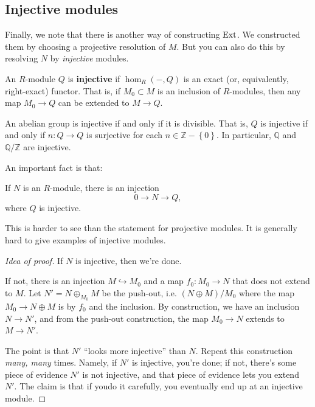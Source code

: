 \subsection{Injective modules}

Finally, we note that there is another way of constructing
$\mathrm{Ext}$. We
constructed them by choosing a projective resolution of $M$. But
you can also
do this by resolving $N$ by \emph{injective} modules. 
\begin{definition} 
An $R$-module $Q$ is \textbf{injective} if $\hom_R(-,Q)$ is an
exact (or,
equivalently, right-exact) functor. That is, if $M_0 \subset M$
is an inclusion
of $R$-modules, then any map $M_0 \to Q$ can be extended to $M
\to Q$.
\end{definition} 


\begin{example} 
An abelian group is injective if and only if it is divisible.
That is, $Q$
is injective
if and only if $n: Q \to Q$ is surjective for each $n \in
\mathbb{Z} -
\left\{0\right\}$.
In particular, $\mathbb{Q}$ and $\mathbb{Q}/\mathbb{Z}$ are
injective.
\end{example} 

An important fact is that:

\begin{proposition} 
If $N$ is an $R$-module, there is an injection
\[ 0 \to N \to Q,  \]
where $Q$ is injective.
\end{proposition} 
This is harder to see than the statement for projective modules.
It is
generally hard to give examples of injective modules.
\begin{proof}[Idea of proof] If $N$ is injective, then we're
done.

If not, there is an injection $M \hookrightarrow M_0$ and a map
$f_0: M_0 \to N$
that does not extend to $M$. Let $N' = N \oplus_{M_0} M$ be the
push-out, i.e.
$(N \oplus M)/M_0$ where the map $M_0 \to N \oplus M$ is by
$f_0$ and the
inclusion. By construction, we have an inclusion $N \to N'$, and
from the
push-out construction, the map $M_0 \to N$ extends to $M \to
N'$.

The point is that $N'$ ``looks more injective'' than $N$. Repeat
this
construction \emph{many, many} times. Namely, if $N'$ is
injective, you're
done; if not, there's some piece of evidence $N'$ is not
injective, and that
piece of evidence lets you extend $N'$. The claim is that if
youdo it
carefully, you eventually end up at an injective module. 

\end{proof} 


